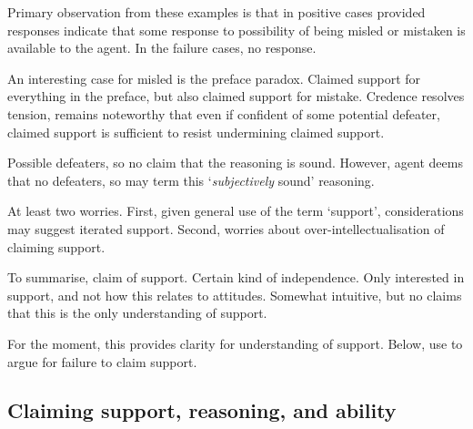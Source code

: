 \begin{note}
  Primary observation from these examples is that in positive cases provided responses indicate that some response to possibility of being misled or mistaken is available to the agent.
  In the failure cases, no response.


  An interesting case for misled is the preface paradox.
  Claimed support for everything in the preface, but also claimed support for mistake.
  Credence resolves tension, remains noteworthy that even if confident of some potential defeater, claimed support is sufficient to resist undermining claimed support.

\end{note}

\begin{note}[???]
  \color{red}
  Possible defeaters, so no claim that the reasoning is sound.
  However, agent deems that no defeaters, so may term this `\emph{subjectively} sound' reasoning.

  At least two worries.
  First, given general use of the term `support', considerations may suggest iterated support.
  Second, worries about over-intellectualisation of claiming support.
\end{note}


\begin{note}
  To summarise, claim of support.
  Certain kind of independence.
  Only interested in support, and not how this relates to attitudes.
  Somewhat intuitive, but no claims that this is the only understanding of support.

  For the moment, this provides clarity for understanding of support.
  Below, use to argue for failure to claim support.
\end{note}

\subsection{Claiming support, reasoning, and ability}
\label{sec:inter-with-claim}

